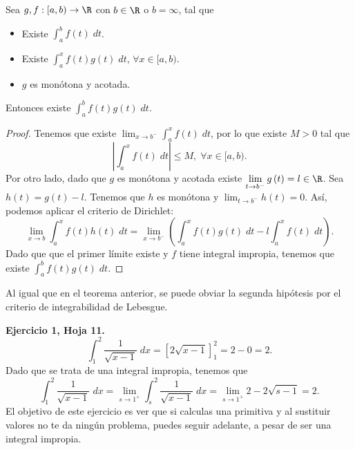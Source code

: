 \begin{ftheorem}
\normalfont Sea $\displaystyle g,f : [a,b) \to \R $ con $\displaystyle b \in \R $ o $\displaystyle b = \infty $, tal que 
\begin{itemize}
\item Existe $\displaystyle \int^{b}_{a} f\left(t\right) \; dt $.
\item Existe $\displaystyle \int^{x}_{a} f\left(t\right)g\left(t\right) \; dt $, $\displaystyle \forall x \in [a,b) $.
\item $\displaystyle g $ es monótona y acotada.
\end{itemize}
Entonces existe $\displaystyle \int^{b}_{a} f\left(t\right)g\left(t\right) \; dt $.
\end{ftheorem}
\begin{proof}
	Tenemos que existe $\displaystyle \lim_{x \to b^{-}}\int^{x}_{a} f\left(t\right) \; dt $, por lo que existe $\displaystyle M > 0 $ tal que 
	\[ \left|\int^{x}_{a} f\left(t\right) \; dt\right| \leq M, \; \forall x \in [a,b) .\]
	Por otro lado, dado que $\displaystyle g $ es monótona y acotada existe $\displaystyle \lim_{t \to b^{-}}g\left(t\right) = l \in \R $. Sea $\displaystyle h\left(t\right) = g\left(t\right)-l $. Tenemos que $\displaystyle h $ es monótona y $\displaystyle \lim_{t \to b^{-}}h\left(t\right) = 0 $. Así, podemos aplicar el criterio de Dirichlet:
	\[ \lim_{x \to b}\int^{x}_{a} f\left(t\right)h\left(t\right) \; dt = \lim_{x \to b^{-}}\left(\int^{x}_{a} f\left(t\right)g\left(t\right) \; dt - l\int^{x}_{a} f\left(t\right) \; dt\right) .\]
Dado que que el primer límite existe y $\displaystyle f $ tiene integral impropia, tenemos que existe $\displaystyle \int^{b}_{a} f\left(t\right)g\left(t\right) \; dt $.	
\end{proof}
\begin{observation}
\normalfont Al igual que en el teorema anterior, se puede obviar la segunda hipótesis por el criterio de integrabilidad de Lebesgue.
\end{observation}
\begin{eg}
\normalfont \textbf{Ejercicio 1, Hoja 11.} 
\[\int^{2}_{1} \frac{1}{\sqrt{x-1}} \; dx = \left[2\sqrt{x-1}\right]^{2}_{1} = 2 - 0 = 2 .\]
Dado que se trata de una integral impropia, tenemos que 
\[\int^{2}_{1} \frac{1}{\sqrt{x-1}} \; dx = \lim_{s \to 1^{+}}\int^{2}_{s} \frac{1}{\sqrt{x-1}} \; dx = \lim_{s \to 1^{+}}2 - 2\sqrt{s-1} = 2 .\]
El objetivo de este ejercicio es ver que si calculas una primitiva y al sustituir valores no te da ningún problema, puedes seguir adelante, a pesar de ser una integral impropia.
\end{eg}
